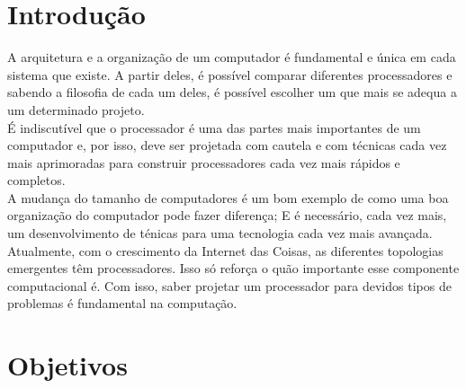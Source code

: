 \documentclass[
	12pt,
	openright,
	a4paper,
	english,			
	french,				
	spanish,			
	brazil,				
	]{abntex2}
\begin{document}

\frenchspacing 

\imprimircapa
\imprimirfolhaderosto*


\listoffigures*
\clearpage

\listoftables*
\clearpage

\tableofcontents*


\textual

\chapter{Introdução}
A arquitetura e a organização de um computador é fundamental e 
única em cada sistema que existe. A partir deles, é possível 
comparar diferentes processadores e sabendo a filosofia de 
cada um deles, é possível escolher um que mais se adequa a um
 determinado projeto.\\
É indiscutível que o processador é uma das partes mais 
importantes de um computador e, por isso, deve ser projetada 
com cautela e com técnicas cada vez mais aprimoradas para 
construir processadores cada vez mais rápidos e completos.\\
A mudança do tamanho de computadores é um bom exemplo de 
como uma boa organização do computador pode fazer diferença; 
E é necessário, cada vez mais, um desenvolvimento de 
ténicas para uma tecnologia cada vez mais avançada.\\
Atualmente, com o crescimento da Internet das Coisas, as diferentes topologias
emergentes têm processadores. Isso só reforça o quão importante
esse componente computacional é. Com isso, saber projetar um processador
para devidos tipos de problemas é fundamental na computação.\\

\chapter[Objetivos]{Objetivos}
\end{document}
